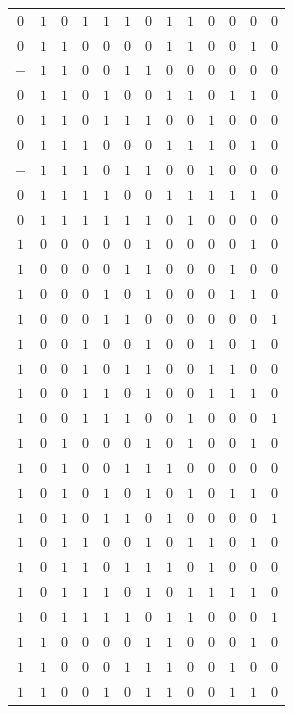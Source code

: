 \documentclass [15pt,a4paper,twoside]{article}
\begin{document}
\begin{center}
\begin{tabular}{cccccc|ccccccc}
$0$&$1$&$0$&$1$&$1$&$1$&$0$&$1$&$1$&$0$&$0$&$0$&$0$\\
$0$&$1$&$1$&$0$&$0$&$0$&$0$&$1$&$1$&$0$&$0$&$1$&$0$\\
$-$&$1$&$1$&$0$&$0$&$1$&$1$&$0$&$0$&$0$&$0$&$0$&$0$\\
$0$&$1$&$1$&$0$&$1$&$0$&$0$&$1$&$1$&$0$&$1$&$1$&$0$\\
$0$&$1$&$1$&$0$&$1$&$1$&$1$&$0$&$0$&$1$&$0$&$0$&$0$\\
$0$&$1$&$1$&$1$&$0$&$0$&$0$&$1$&$1$&$1$&$0$&$1$&$0$\\
$-$&$1$&$1$&$1$&$0$&$1$&$1$&$0$&$0$&$1$&$0$&$0$&$0$\\
$0$&$1$&$1$&$1$&$1$&$0$&$0$&$1$&$1$&$1$&$1$&$1$&$0$\\
$0$&$1$&$1$&$1$&$1$&$1$&$1$&$0$&$1$&$0$&$0$&$0$&$0$\\
$1$&$0$&$0$&$0$&$0$&$0$&$1$&$0$&$0$&$0$&$0$&$1$&$0$\\
$1$&$0$&$0$&$0$&$0$&$1$&$1$&$0$&$0$&$0$&$1$&$0$&$0$\\
$1$&$0$&$0$&$0$&$1$&$0$&$1$&$0$&$0$&$0$&$1$&$1$&$0$\\
$1$&$0$&$0$&$0$&$1$&$1$&$0$&$0$&$0$&$0$&$0$&$0$&$1$\\
$1$&$0$&$0$&$1$&$0$&$0$&$1$&$0$&$0$&$1$&$0$&$1$&$0$\\
$1$&$0$&$0$&$1$&$0$&$1$&$1$&$0$&$0$&$1$&$1$&$0$&$0$\\
$1$&$0$&$0$&$1$&$1$&$0$&$1$&$0$&$0$&$1$&$1$&$1$&$0$\\
$1$&$0$&$0$&$1$&$1$&$1$&$0$&$0$&$1$&$0$&$0$&$0$&$1$\\
$1$&$0$&$1$&$0$&$0$&$0$&$1$&$0$&$1$&$0$&$0$&$1$&$0$\\
$1$&$0$&$1$&$0$&$0$&$1$&$1$&$1$&$0$&$0$&$0$&$0$&$0$\\
$1$&$0$&$1$&$0$&$1$&$0$&$1$&$0$&$1$&$0$&$1$&$1$&$0$\\
$1$&$0$&$1$&$0$&$1$&$1$&$0$&$1$&$0$&$0$&$0$&$0$&$1$\\
$1$&$0$&$1$&$1$&$0$&$0$&$1$&$0$&$1$&$1$&$0$&$1$&$0$\\
$1$&$0$&$1$&$1$&$0$&$1$&$1$&$1$&$0$&$1$&$0$&$0$&$0$\\
$1$&$0$&$1$&$1$&$1$&$0$&$1$&$0$&$1$&$1$&$1$&$1$&$0$\\
$1$&$0$&$1$&$1$&$1$&$1$&$0$&$1$&$1$&$0$&$0$&$0$&$1$\\
$1$&$1$&$0$&$0$&$0$&$0$&$1$&$1$&$0$&$0$&$0$&$1$&$0$\\
$1$&$1$&$0$&$0$&$0$&$1$&$1$&$1$&$0$&$0$&$1$&$0$&$0$\\
$1$&$1$&$0$&$0$&$1$&$0$&$1$&$1$&$0$&$0$&$1$&$1$&$0$\\

\end{tabular}
\end{center}
\end{document}
